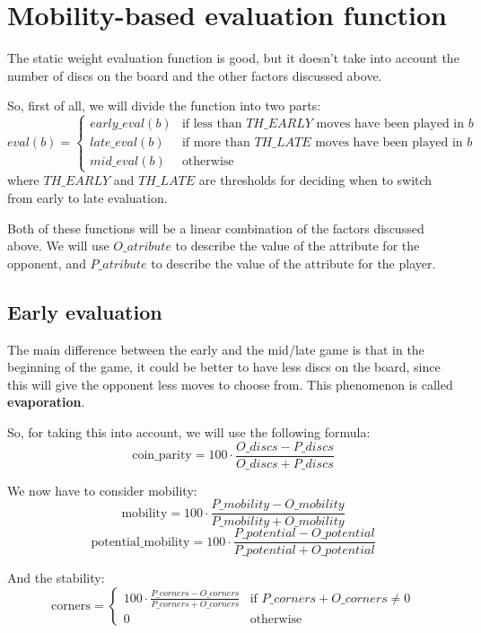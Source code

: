 \documentclass{article}
\begin{document}
\section*{Mobility-based evaluation function}
\quad The static weight evaluation function is good, but it doesn't take into account the number of discs on the board and the other factors discussed above.

So, first of all, we will divide the function into two parts:
\[
  \text{$eval$}(b) = 
  \begin{cases}
    \text{$early\_eval$}(b) & \text{if less than $TH\_EARLY$ moves have been played in $b$} \\
    \text{$late\_eval$}(b) & \text{if more than $TH\_LATE$ moves have been played in $b$} \\
    \text{$mid\_eval$}(b) & \text{otherwise}
  \end{cases}
\]
where $TH\_EARLY$ and $TH\_LATE$ are thresholds for deciding when to switch from early to late evaluation.

Both of these functions will be a linear combination of the factors discussed above.
We will use $O\_atribute$ to describe the value of the attribute for the opponent, and $P\_atribute$ to describe the value of the attribute for the player.

\subsection*{Early evaluation}
\quad The main difference between the early and the mid/late game is that in the beginning of the game, it could be better to have less discs on the board, since this will give the opponent less moves to choose from.
This phenomenon is called \textbf{evaporation}.

So, for taking this into account, we will use the following formula: 
\[
  \text{coin\_parity} = 100 \cdot \frac{O\_discs - P\_discs}{O\_discs + P\_discs}
\]

We now have to consider mobility:
\[
  \text{mobility} = 100 \cdot \frac{P\_mobility - O\_mobility}{P\_mobility + O\_mobility}
\]
\[
  \text{potential\_mobility} = 100 \cdot \frac{P\_potential - O\_potential}{P\_potential + O\_potential}
\]

And the stability:
\[
  \text{corners} = 
  \begin{cases}
    100 \cdot \frac{P\_corners - O\_corners}{P\_corners + O\_corners} & \text{if $P\_corners + O\_corners \neq 0$} \\
    0 & \text{otherwise}
  \end{cases}
\]
\end{document}
